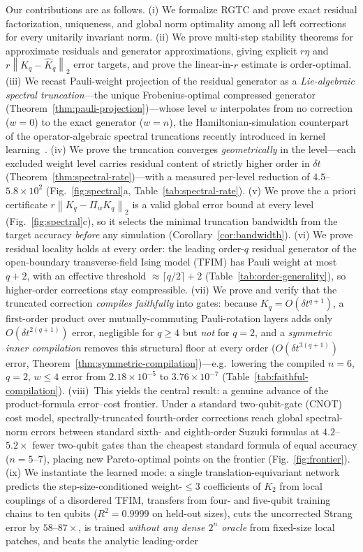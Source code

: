 \documentclass[aps,prresearch,reprint,superscriptaddress,nofootinbib,amsmath,amssymb]{revtex4-2}
\newcommand{\rgtc}{RGTC}
\newcommand{\tfim}{TFIM}
\newcommand{\norm}[1]{\left\lVert #1 \right\rVert}
\newcommand{\dt}{\delta t}
\begin{document}
Our contributions are as follows. (i) We formalize \rgtc{} and prove exact residual factorization, uniqueness, and global norm optimality among all left corrections for every unitarily invariant norm. (ii) We prove multi-step stability theorems for approximate residuals and generator approximations, giving explicit $r\eta$ and $r\norm{K_q-\widehat K_q}_2$ error targets, and prove the linear-in-$r$ estimate is order-optimal. (iii) We recast Pauli-weight projection of the residual generator as a \emph{Lie-algebraic spectral truncation}---the unique Frobenius-optimal compressed generator (Theorem~\ref{thm:pauli-projection})---whose level $w$ interpolates from no correction ($w=0$) to the exact generator ($w=n$), the Hamiltonian-simulation counterpart of the operator-algebraic spectral truncations recently introduced in kernel learning~\cite{hashimoto2024spectral,hashimoto2023rkhm}. (iv) We prove the truncation converges \emph{geometrically} in the level---each excluded weight level carries residual content of strictly higher order in $\dt$ (Theorem~\ref{thm:spectral-rate})---with a measured per-level reduction of $4.5$--$5.8\times10^{2}$ (Fig.~\ref{fig:spectral}a, Table~\ref{tab:spectral-rate}). (v) We prove the a priori certificate $r\norm{K_q-\Pi_wK_q}_2$ is a valid global error bound at every level (Fig.~\ref{fig:spectral}c), so it selects the minimal truncation bandwidth from the target accuracy \emph{before} any simulation (Corollary~\ref{cor:bandwidth}). (vi) We prove residual locality holds at every order: the leading order-$q$ residual generator of the open-boundary transverse-field Ising model (\tfim{}) has Pauli weight at most $q+2$, with an effective threshold $\approx\lceil q/2\rceil+2$ (Table~\ref{tab:order-generality}), so higher-order corrections stay compressible. (vii) We prove and verify that the truncated correction \emph{compiles faithfully} into gates: because $K_q=O(\dt^{q+1})$, a first-order product over mutually-commuting Pauli-rotation layers adds only $O(\dt^{2(q+1)})$ error, negligible for $q\ge4$ but \emph{not} for $q=2$, and a \emph{symmetric inner compilation} removes this structural floor at every order ($O(\dt^{3(q+1)})$ error, Theorem~\ref{thm:symmetric-compilation})---e.g.\ lowering the compiled $n=6$, $q=2$, $w\le4$ error from $2.18\times10^{-5}$ to $3.76\times10^{-7}$ (Table~\ref{tab:faithful-compilation}). (viii)~This yields the central result: a genuine advance of the product-formula error--cost frontier. Under a standard two-qubit-gate (CNOT) cost model, spectrally-truncated fourth-order corrections reach global spectral-norm errors between standard sixth- and eighth-order Suzuki formulas at $4.2$--$5.2\times$ fewer two-qubit gates than the cheapest standard formula of equal accuracy ($n=5$--$7$), placing new Pareto-optimal points on the frontier (Fig.~\ref{fig:frontier}). (ix) We instantiate the learned mode: a single translation-equivariant network predicts the step-size-conditioned weight-$\leq3$ coefficients of $K_2$ from local couplings of a disordered \tfim{}, transfers from four- and five-qubit training chains to ten qubits ($R^2=0.9999$ on held-out sizes), cuts the uncorrected Strang error by $58$--$87\times$, is trained \emph{without any dense $2^n$ oracle} from fixed-size local patches, and beats the analytic leading-order 
\end{document}
